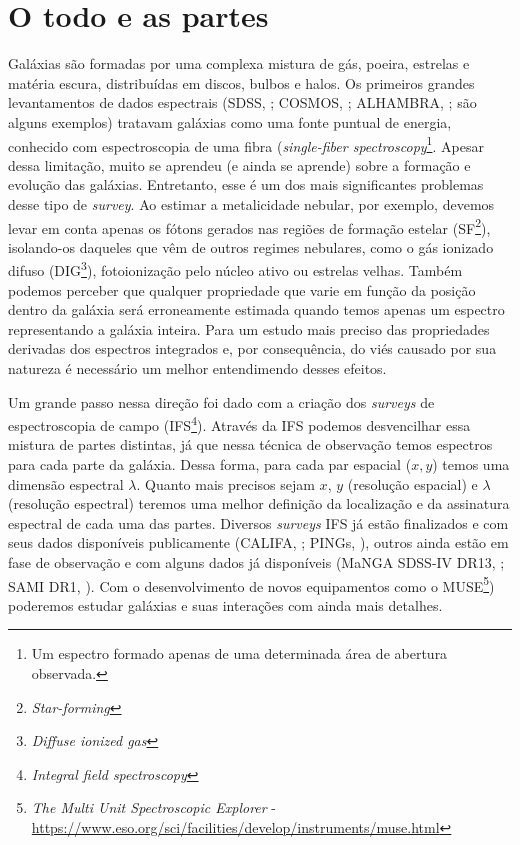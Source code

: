 \section{O todo e as partes}
\label{sec:intro:partes}

Galáxias são formadas por uma complexa mistura de gás, poeira, estrelas e matéria escura, distribuídas em discos, bulbos e halos. Os primeiros grandes levantamentos de dados espectrais (SDSS, \citealt{York.etal.2000a}; COSMOS, \citealt{Scoville.etal.2007}; ALHAMBRA, \citealt{Moles.etal.2008}; são alguns exemplos) tratavam galáxias como uma fonte puntual de energia, conhecido com espectroscopia de uma fibra ({\em single-fiber spectroscopy}\footnote{Um espectro formado apenas de uma determinada área de abertura observada.}. Apesar dessa limitação, muito se aprendeu (e ainda se aprende) sobre a formação e evolução das galáxias. Entretanto, esse é um dos mais significantes problemas desse tipo de {\em survey}. Ao estimar a metalicidade nebular, por exemplo, devemos levar em conta apenas os fótons gerados nas regiões de formação estelar (SF\footnote{{\em Star-forming}}), isolando-os daqueles que vêm de outros regimes nebulares, como o gás ionizado difuso (DIG\footnote{{\em Diffuse ionized gas}}), fotoionização pelo núcleo ativo ou estrelas velhas. Também podemos perceber que qualquer propriedade que varie em função da posição dentro da galáxia será erroneamente estimada quando temos apenas um espectro representando a galáxia inteira. Para um estudo mais preciso das propriedades derivadas dos espectros integrados e, por consequência, do viés causado por sua natureza é necessário um melhor entendimendo desses efeitos.

Um grande passo nessa direção foi dado com a criação dos {\em surveys} de espectroscopia de campo (IFS\footnote{{\em Integral field spectroscopy}}). Através da IFS podemos desvencilhar essa mistura de partes distintas, já que nessa técnica de observação temos espectros para cada parte da galáxia. Dessa forma, para cada par espacial ($x,y$) temos uma dimensão espectral $\lambda$. Quanto mais precisos sejam $x$, $y$ (resolução espacial) e $\lambda$ (resolução espectral) teremos uma melhor definição da localização e da assinatura espectral de cada uma das partes. Diversos {\em surveys} IFS já estão finalizados e com seus dados disponíveis publicamente (CALIFA, \citealt{Sanchez.etal.2012a}; PINGs, \citealt{RosalesOrtega.etal.2010}), outros ainda estão em fase de observação e com alguns dados já disponíveis (MaNGA SDSS-IV DR13, \citealt{MaNGADR1.2017}; SAMI DR1, \citealt{SAMIDR1.2017}). Com o desenvolvimento de novos equipamentos como o MUSE\footnote{{\em The Multi Unit Spectroscopic Explorer} - \url{https://www.eso.org/sci/facilities/develop/instruments/muse.html}}) poderemos estudar galáxias e suas interações com ainda mais detalhes.


